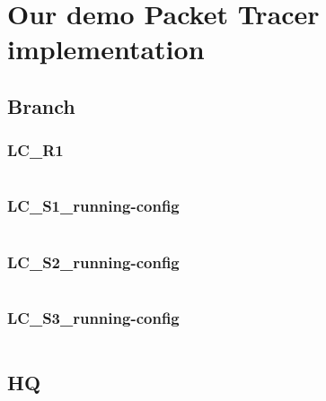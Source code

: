 




\clearpage %

\nocite{*}





\clearpage %
\appendix

\section{Our demo Packet Tracer implementation} \label{config}

\subsection{Branch} \label{configbranch}
\subsubsection{LC\_R1} \label{configwlc}
\inputminted[fontsize=\tiny,linenos,breaklines]{text}{./Config/Branch/LC-R1.txt}
\subsubsection{LC\_S1\_running-config} \label{configwlc}
\inputminted[fontsize=\tiny,linenos,breaklines]{text}{./Config/Branch/LC-S1-running-config.txt}
\subsubsection{LC\_S2\_running-config} \label{configwlc}
\inputminted[fontsize=\tiny,linenos,breaklines]{text}{./Config/Branch/LC-S2-running-config.txt}
\subsubsection{LC\_S3\_running-config} \label{configwlc}
\inputminted[fontsize=\tiny,linenos,breaklines]{text}{./Config/Branch/LC-S3-running-config.txt}

\subsection{HQ} \label{confighq}
